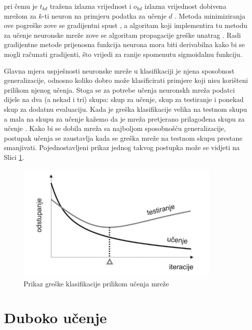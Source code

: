 \documentclass[lmodern, utf8, diplomski, numeric]{fer}
\begin{document}
\hspace{2em}

pri čemu je $t_{kd}$ tražena izlazna vrijednost i $o_{kd}$  izlazna vrijednost dobivena mrežom za $k$-ti neuron na primjeru podatka za učenje $d$ \cite{cupic2008neuro}. Metoda minimiziranja ove pogreške zove se gradijentni spust , a algoritam koji implementira tu metodu za učenje neuronske mreže zove se algoritam propagacije greške unatrag  \cite{backProp}. Radi gradijentne metode prijenosna funkcija neurona mora biti derivabilna kako bi se mogli računati gradijenti, što vrijedi za ranije spomenutu sigmoidalnu funkciju.

Glavna mjera uspješnosti neuronske mreže u klasifikaciji je njena sposobnost generalizacije, odnosno koliko dobro može klasificirati primjere koji nisu korišteni prilikom njenog učenja. Stoga se za potrebe učenja neuronskh mreža podatci dijele na dva (a nekad i tri) skupa: skup za učenje, skup za testiranje i ponekad skup za dodatnu evaluaciju. Kada je greška klasifikacije velika na testnom skupu a mala na skupu za učenje kažemo da je mreža pretjerano prilagođena skupu za učenje . Kako bi se dobila mreža sa najboljom sposobnošću generalizacije, postupak učenja se zaustavlja kada se greška mreže na testnom skupu prestane smanjivati. Pojednostavljeni prikaz jednog takvog postupka može se vidjeti na Slici \ref{fig:generalization}. 

\begin{figure}[ht!]
\centering
\includegraphics[width=10cm]{slike/generalization.png}
\caption{Prikaz greške klasifikacije prilikom učenja mreže}
\label{fig:generalization}
\end{figure}


\chapter{Duboko učenje}
\end{document}
